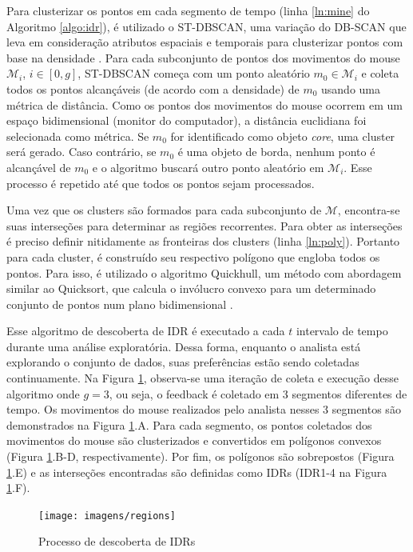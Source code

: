 Para clusterizar os pontos em cada segmento de tempo (linha \ref{ln:mine} do Algoritmo \ref{algo:idr}), é utilizado o ST-DBSCAN, uma variação do DB-SCAN que leva em consideração atributos espaciais e temporais para clusterizar pontos com base na densidade \cite{Birant:2007}. Para cada subconjunto de pontos dos movimentos do mouse $\mathcal{M}_i$, $i \in [0,g]$, ST-DBSCAN começa com um ponto aleatório $m_0 \in \mathcal{M}_i$ e coleta todos os pontos alcançáveis (de acordo com a densidade) de $m_0$ usando uma métrica de distância. Como os pontos dos movimentos do mouse ocorrem em um espaço bidimensional (monitor do computador), a distância euclidiana foi selecionada como métrica. Se $m_0$ for identificado como objeto {\em core}, uma cluster será gerado. Caso contrário, se $m_0$ é uma objeto de borda, nenhum ponto é alcançável de $m_0$ e o algoritmo buscará outro ponto aleatório em $\mathcal{M}_i$. Esse processo é repetido até que todos os pontos sejam processados.

Uma vez que os clusters são formados para cada subconjunto de $\mathcal{M}$, encontra-se suas interseções para determinar as regiões recorrentes. Para obter as interseções é preciso definir nitidamente as fronteiras dos clusters (linha \ref{ln:poly}). Portanto para cada cluster, é construído seu respectivo polígono que engloba todos os pontos. Para isso, é utilizado o algoritmo Quickhull, um método com abordagem similar ao Quicksort, que calcula o invólucro convexo para um determinado conjunto de pontos num plano bidimensional \cite{Barber:1996}.

Esse algoritmo de descoberta de IDR é executado a cada $t$ intervalo de tempo durante uma análise exploratória. Dessa forma, enquanto o analista está explorando o conjunto de dados, suas preferências estão sendo coletadas continuamente. Na Figura \ref{fig:descoberta-idr}, observa-se uma iteração de coleta e execução desse algoritmo onde $g = 3$, ou seja, o feedback é coletado em 3 segmentos diferentes de tempo. Os movimentos do mouse realizados pelo analista nesses 3 segmentos são demonstrados na Figura \ref{fig:descoberta-idr}.A. Para cada segmento, os pontos coletados dos movimentos do mouse são clusterizados e convertidos em polígonos convexos (Figura \ref{fig:descoberta-idr}.B-D, respectivamente). Por fim, os polígonos são sobrepostos (Figura \ref{fig:descoberta-idr}.E) e as interseções encontradas são definidas como IDRs (IDR1-4 na Figura \ref{fig:descoberta-idr}.F).

\begin{figure}[t]
	\centering
	\texttt{[image: imagens/regions]}
	\caption{Processo de descoberta de IDRs}
	\label{fig:descoberta-idr}
\end{figure}

